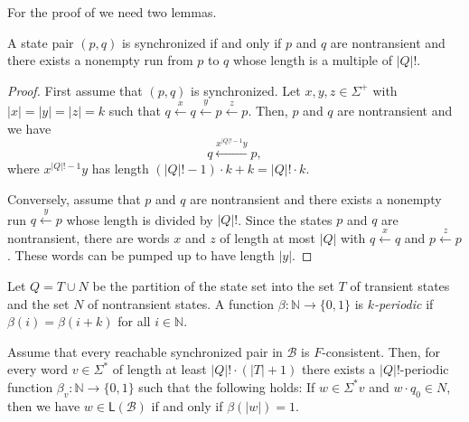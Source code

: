 \documentclass{theoretics}
\newcommand{\N}{\mathbb{N}}
\newcommand{\B}{\mathcal{B}}
\renewcommand{\L}{\mathsf{L}}
\begin{document}
For the proof of  we need two lemmas.

\begin{lemma}
	\label{lem:factorial-length}
	A state pair $(p,q)$ is synchronized
	if and only if $p$ and $q$ are nontransient
	and there exists a nonempty run from $p$ to $q$ whose 
	length is a multiple of $|Q|!$.
\end{lemma}

\begin{proof}
        First assume that $(p,q)$ is synchronized.
	Let $x,y,z\in\Sigma^+$ with $|x|=|y|=|z|=k$ such that
	$q \xleftarrow{x} q \xleftarrow{y} p \xleftarrow{z} p$.
	Then, $p$ and $q$ are nontransient and we have 
	\[  q \xleftarrow{x^{|Q|!-1}y} p, \]
	where $x^{|Q|!-1}y$ has length $(|Q|!-1) \cdot k + k = |Q|! \cdot k$.

	Conversely, assume that $p$ and $q$ are nontransient
	and there exists a nonempty run $q \xleftarrow{y} p$ whose length is divided by $|Q|!$.
	Since the states $p$ and $q$ are nontransient,
	there are words $x$ and $z$ of length at most $|Q|$ with
	$q \xleftarrow{x} q$ and $p \xleftarrow{z} p$.
	These words can be pumped up to have length $|y|$.
\end{proof}

Let $Q = T \cup N$ be the partition of the state set into the set $T$ of transient states and the set $N$ of nontransient states.
A function $\beta \colon \N \to \{0,1\}$ is {\em $k$-periodic} if $\beta(i) = \beta(i+k)$ for all $i \in \N$.

\begin{lemma}
	\label{lem:periodic}
	Assume that every reachable synchronized pair in $\B$ is $F$-consistent.
	Then, for every word $v \in \Sigma^*$ of length at least $|Q|! \cdot (|T|+1)$
	there exists a $|Q|!$-periodic function $\beta_v \colon \N \to \{0,1\}$ such that the following holds:
	If $w \in \Sigma^* v$ and $w \cdot q_0 \in N$, then we have
	$w \in \L(\B)$ if and only if $\beta(|w|) = 1$.
\end{lemma}
\end{document}

